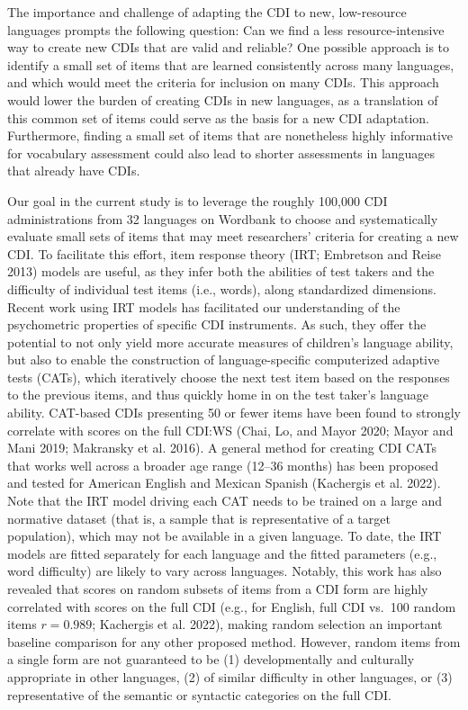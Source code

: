 \documentclass[
  letterpaper,
  DIV=11,
  numbers=noendperiod]{scrartcl}
\begin{document}
The importance and challenge of adapting the CDI to new, low-resource
languages prompts the following question: Can we find a less
resource-intensive way to create new CDIs that are valid and reliable?
One possible approach is to identify a small set of items that are
learned consistently across many languages, and which would meet the
criteria for inclusion on many CDIs. This approach would lower the
burden of creating CDIs in new languages, as a translation of this
common set of items could serve as the basis for a new CDI adaptation.
Furthermore, finding a small set of items that are nonetheless highly
informative for vocabulary assessment could also lead to shorter
assessments in languages that already have CDIs.

Our goal in the current study is to leverage the roughly 100,000 CDI
administrations from 32 languages on Wordbank to choose and
systematically evaluate small sets of items that may meet researchers'
criteria for creating a new CDI. To facilitate this effort, item
response theory (IRT; Embretson and Reise 2013) models are useful, as
they infer both the abilities of test takers and the difficulty of
individual test items (i.e., words), along standardized dimensions.
Recent work using IRT models has facilitated our understanding of the
psychometric properties of specific CDI instruments. As such, they offer
the potential to not only yield more accurate measures of children's
language ability, but also to enable the construction of
language-specific computerized adaptive tests (CATs), which iteratively
choose the next test item based on the responses to the previous items,
and thus quickly home in on the test taker's language ability. CAT-based
CDIs presenting 50 or fewer items have been found to strongly correlate
with scores on the full CDI:WS (Chai, Lo, and Mayor 2020; Mayor and Mani
2019; Makransky et al. 2016). A general method for creating CDI CATs
that works well across a broader age range (12--36 months) has been
proposed and tested for American English and Mexican Spanish (Kachergis
et al. 2022). Note that the IRT model driving each CAT needs to be
trained on a large and normative dataset (that is, a sample that is
representative of a target population), which may not be available in a
given language. To date, the IRT models are fitted separately for each
language and the fitted parameters (e.g., word difficulty) are likely to
vary across languages. Notably, this work has also revealed that scores
on random subsets of items from a CDI form are highly correlated with
scores on the full CDI (e.g., for English, full CDI vs.~100 random items
\(r=0.989\); Kachergis et al. 2022), making random selection an
important baseline comparison for any other proposed method. However,
random items from a single form are not guaranteed to be (1)
developmentally and culturally appropriate in other languages, (2) of
similar difficulty in other languages, or (3) representative of the
semantic or syntactic categories on the full CDI.
\end{document}

